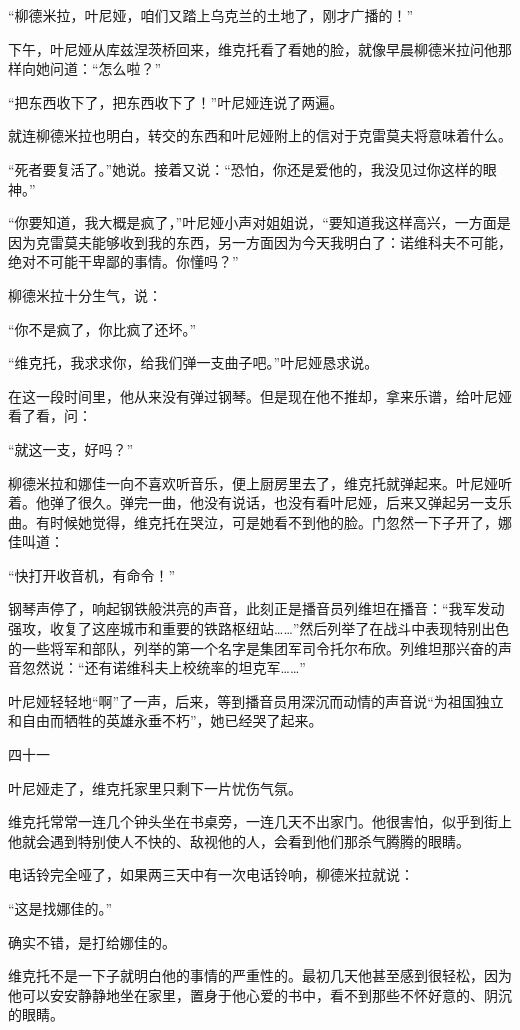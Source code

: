“柳德米拉，叶尼娅，咱们又踏上乌克兰的土地了，刚才广播的！”

下午，叶尼娅从库兹涅茨桥回来，维克托看了看她的脸，就像早晨柳德米拉问他那样向她问道：“怎么啦？”

“把东西收下了，把东西收下了！”叶尼娅连说了两遍。

就连柳德米拉也明白，转交的东西和叶尼娅附上的信对于克雷莫夫将意味着什么。

“死者要复活了。”她说。接着又说：“恐怕，你还是爱他的，我没见过你这样的眼神。”

“你要知道，我大概是疯了，”叶尼娅小声对姐姐说，“要知道我这样高兴，一方面是因为克雷莫夫能够收到我的东西，另一方面因为今天我明白了：诺维科夫不可能，绝对不可能干卑鄙的事情。你懂吗？”

柳德米拉十分生气，说：

“你不是疯了，你比疯了还坏。”

“维克托，我求求你，给我们弹一支曲子吧。”叶尼娅恳求说。

在这一段时间里，他从来没有弹过钢琴。但是现在他不推却，拿来乐谱，给叶尼娅看了看，问：

“就这一支，好吗？”

柳德米拉和娜佳一向不喜欢听音乐，便上厨房里去了，维克托就弹起来。叶尼娅听着。他弹了很久。弹完一曲，他没有说话，也没有看叶尼娅，后来又弹起另一支乐曲。有时候她觉得，维克托在哭泣，可是她看不到他的脸。门忽然一下子开了，娜佳叫道：

“快打开收音机，有命令！”

钢琴声停了，响起钢铁般洪亮的声音，此刻正是播音员列维坦在播音：“我军发动强攻，收复了这座城市和重要的铁路枢纽站……”然后列举了在战斗中表现特别出色的一些将军和部队，列举的第一个名字是集团军司令托尔布欣。列维坦那兴奋的声音忽然说：“还有诺维科夫上校统率的坦克军……”

叶尼娅轻轻地“啊”了一声，后来，等到播音员用深沉而动情的声音说“为祖国独立和自由而牺牲的英雄永垂不朽”，她已经哭了起来。

四十一

叶尼娅走了，维克托家里只剩下一片忧伤气氛。

维克托常常一连几个钟头坐在书桌旁，一连几天不出家门。他很害怕，似乎到街上他就会遇到特别使人不快的、敌视他的人，会看到他们那杀气腾腾的眼睛。

电话铃完全哑了，如果两三天中有一次电话铃响，柳德米拉就说：

“这是找娜佳的。”

确实不错，是打给娜佳的。

维克托不是一下子就明白他的事情的严重性的。最初几天他甚至感到很轻松，因为他可以安安静静地坐在家里，置身于他心爱的书中，看不到那些不怀好意的、阴沉的眼睛。

